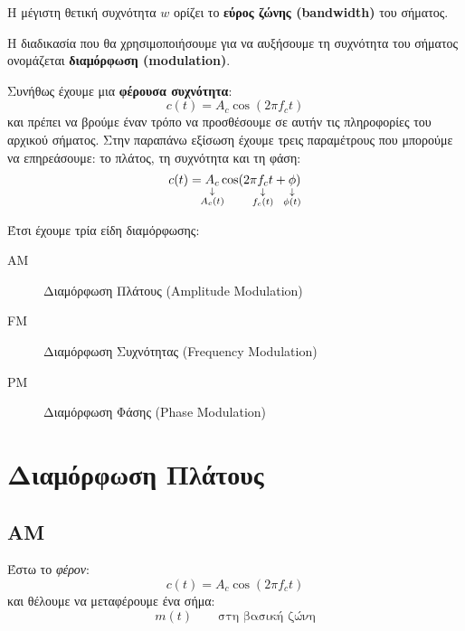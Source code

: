 \documentclass[11pt,a4paper,notitlepage,fleqn]{article}
\begin{document}

Η μέγιστη θετική συχνότητα \( w \) ορίζει το \textbf{εύρος ζώνης (bandwidth)} του σήματος.

Η διαδικασία που θα χρησιμοποιήσουμε για να αυξήσουμε τη συχνότητα του σήματος ονομάζεται
\textbf{διαμόρφωση (modulation)}.

Συνήθως έχουμε μια \textbf{φέρουσα συχνότητα}:
\[
c(t) = A_c\cos(2\pi f_c t)
\]
και πρέπει να βρούμε έναν τρόπο να προσθέσουμε σε αυτήν τις πληροφορίες του αρχικού σήματος.
Στην παραπάνω εξίσωση έχουμε τρεις παραμέτρους που μπορούμε να επηρεάσουμε: το πλάτος,
τη συχνότητα και τη φάση:
\[
c(t) =
\underset{\substack{\downarrow\\\mathclap{A_c(t)}}}{A_c}
\cos(2\pi
\underset{\substack{\downarrow\\\mathclap{f_c(t)}}}{f_c}
t
+
\underset{\substack{\downarrow\\\mathclap{\phi(t)}}}{\phi}
)
\]

Έτσι έχουμε τρία είδη διαμόρφωσης:
\begin{description}
	\item[AM] Διαμόρφωση Πλάτους (Amplitude Modulation)
	\item[FM] Διαμόρφωση Συχνότητας (Frequency Modulation)
	\item[PM] Διαμόρφωση Φάσης (Phase Modulation)
\end{description}

\newpage

\section{Διαμόρφωση Πλάτους}

\subsection{AM}
Έστω το \emph{φέρον}:
\[
c(t) = A_c\cos(2\pi f_c t)
\]
και θέλουμε να μεταφέρουμε ένα σήμα:
\[
m(t) \qquad \text{στη βασική ζώνη}
\]
\end{document}
